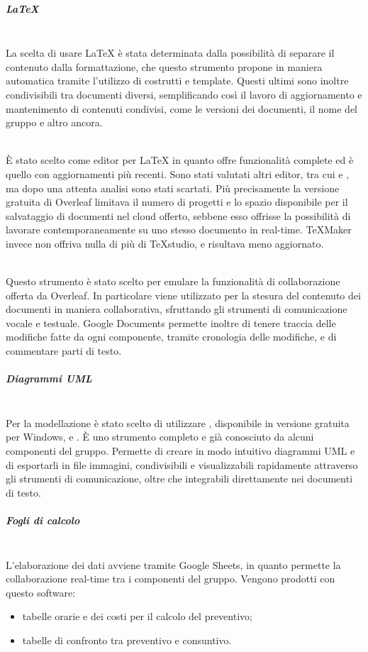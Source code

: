 \subparagraph{\LaTeX}\mbox{}\\
La scelta di usare \LaTeX{} è stata determinata dalla possibilità di separare il contenuto dalla formattazione, che questo strumento propone in maniera automatica tramite l'utilizzo di costrutti e template. Questi ultimi sono inoltre condivisibili tra documenti diversi, semplificando così il lavoro di aggiornamento e mantenimento di contenuti condivisi, come le versioni dei documenti, il nome del gruppo e altro ancora.

\mbox{}\\
\`{E} stato scelto  come editor per \LaTeX{} in quanto offre funzionalità complete ed è quello con aggiornamenti più recenti. Sono stati valutati altri editor, tra cui  e , ma dopo una attenta analisi sono stati scartati. Più precisamente la versione gratuita di Overleaf limitava il numero di progetti e lo spazio disponibile per il salvataggio di documenti nel cloud offerto, sebbene esso offrisse la possibilità di lavorare contemporaneamente su uno stesso documento in real-time. TeXMaker invece non offriva nulla di più di TeXstudio, e risultava meno aggiornato.

\mbox{}\\
Questo strumento è stato scelto per emulare la funzionalità di collaborazione offerta da Overleaf. In particolare viene utilizzato per la stesura del contenuto dei documenti in maniera collaborativa, sfruttando gli strumenti di comunicazione vocale e testuale. Google Documents permette inoltre di tenere traccia delle modifiche fatte da ogni componente, tramite cronologia delle modifiche, e di commentare parti di testo. 

\subparagraph{Diagrammi UML}\mbox{}\\
Per la modellazione  è stato scelto di utilizzare \textbf{}, disponibile in versione gratuita per Windows, \Macos{} e . \`{E} uno strumento completo e già conosciuto da alcuni componenti del gruppo. Permette di creare in modo intuitivo diagrammi UML e di esportarli in file immagini, condivisibili e visualizzabili rapidamente attraverso gli strumenti di comunicazione, oltre che integrabili direttamente nei documenti di testo.

\subparagraph{Fogli di calcolo} \label{sec:fogli_di_calcolo}\mbox{}
\mbox{}\\
L'elaborazione dei dati avviene tramite Google Sheets, in quanto permette la collaborazione real-time tra i componenti del gruppo. Vengono prodotti con questo software:
	\begin{itemize}
	\item tabelle orarie e dei costi per il calcolo del preventivo;
	\item tabelle di confronto tra preventivo e consuntivo.
	\end{itemize}


